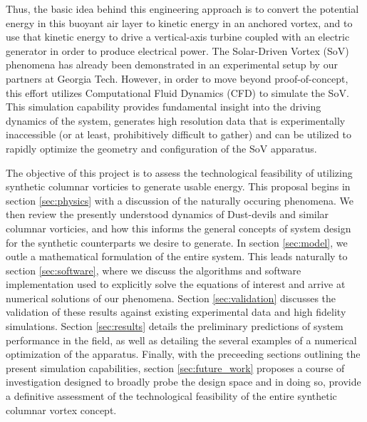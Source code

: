 Thus, the basic idea behind this engineering approach is to convert the 
potential energy in this buoyant air layer to kinetic energy in an
anchored vortex, and to use that kinetic energy to drive a
vertical-axis turbine coupled with an electric generator in order to
produce electrical power. 
The Solar-Driven Vortex (SoV) phenomena has already been demonstrated in
an experimental setup by our partners at Georgia Tech. However, in order to 
move beyond proof-of-concept, this effort utilizes Computational Fluid 
Dynamics (CFD) to simulate the SoV. This simulation capability provides 
fundamental insight into the 
driving dynamics of the system, generates high resolution data that is 
experimentally inaccessible (or at least, prohibitively difficult to gather) 
and can be utilized to rapidly optimize the geometry and configuration of 
the SoV apparatus. 


%
%

The objective of this project is to assess the technological feasibility of 
utilizing synthetic columnar vorticies to generate usable energy. 
This proposal begins in section \ref{sec:physics} with a discussion of the 
naturally occuring phenomena. We then
review the presently understood dynamics of Dust-devils and similar
columnar vorticies, and how this informs the general concepts of system 
design for the synthetic counterparts we desire to generate. 
In section \ref{sec:model}, we outle a mathematical formulation of the entire system. 
This leads naturally to section \ref{sec:software}, where we discuss the 
algorithms and software implementation used to explicitly solve the
equations of interest and arrive at numerical solutions of our
phenomena. Section \ref{sec:validation} discusses the validation of
these results against existing experimental data and high fidelity
simulations. Section \ref{sec:results} details the preliminary
predictions of system performance in the field, as well as detailing the
several examples of a numerical optimization of the apparatus. Finally, with the 
preceeding sections outlining the present simulation capabilities, 
section \ref{sec:future_work} proposes a course of investigation
designed to broadly probe the design space and in doing so, provide a
definitive assessment of the technological feasibility of the entire 
synthetic columnar vortex concept. 



